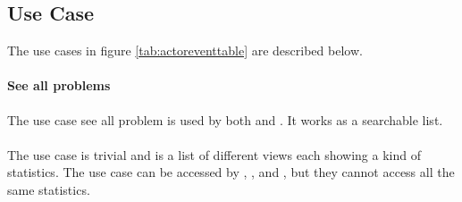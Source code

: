 \subsection{Use Case}
\label{sec:usecase}

The use cases in figure \ref{tab:actoreventtable} are described below.  

\paragraph{See all problems} The use case see all problem is used by both \aclient{} and \astaff{}. It works as a searchable list. 


\paragraph{\gstat[c]} The use case \gstat[] is trivial and is a list of different views each showing a kind of statistics. The use case can be accessed by \sadmin{}, \aclient{}, and \astaff{}, but they cannot access all the same statistics.

